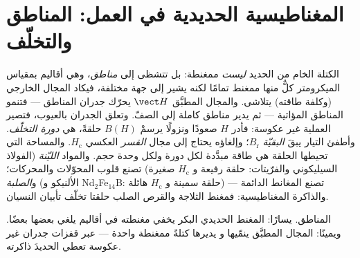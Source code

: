 \section{المغناطيسية الحديدية في العمل: المناطق والتخلّف}

\begin{definition}\label{def:b3:electromagnetism-in-matter:hysteresis}
الكتلة الخام من الحديد \emph{ليست} ممغنطة: بل تتشظى إلى
\emph{مناطق}، وهي أقاليم بمقياس الميكرومتر كلٌّ منها ممغنط تمامًا لكنه
يشير إلى جهة مختلفة، فيكاد المجال الخارجي (وكلفة طاقته)
يتلاشى. والمجال المطبَّق $\vect H$ يحرّك جدران المناطق ---
فتنمو المناطق المؤاتية --- ثم يدير مناطق كاملة إلى
الصفّ. وتعلق الجدران بالعيوب، فتصير العملية غير عكوسة: فأدر
$H$ صعودًا ونزولًا يرسمْ $B(H)$ حلقةً، هي \emph{دورة
التخلّف}. وأطفئ التيار يبقَ \emph{ البقيّة}
$B_{\text{r}}$؛ وإلغاؤه يحتاج إلى مجال \emph{القسر}
العكسي $H_{\text{c}}$. والمساحة التي تحيطها الحلقة هي
طاقة مبدَّدة لكل دورة ولكل وحدة حجم. والمواد \emph{الليّنة}
(الفولاذ السيليكوني والفرّيتات: حلقة رفيعة و
$H_{\text{c}}$ صغيرة) تصنع قلوب المحوّلات والمحركات؛ و\emph{الصلبة}
(الألنيكو و Nd$_2$Fe$_{14}$B: حلقة سمينة و $H_{\text{c}}$ هائلة) تصنع
المغانط الدائمة --- والذاكرة المغناطيسية: فمغنط الثلاجة
والقرص الصلب حلقتا تخلّف تأبيان النسيان.
\end{definition}

\begin{omfigure}

{\small المناطق. يسارًا: المغنط الحديدي البكر يخفي مغنطته
في أقاليم يلغي بعضها بعضًا. ويمينًا: المجال المطبَّق ينمّيها و
يديرها كتلةً ممغنطة واحدة --- عبر قفزات جدران غير عكوسة
تعطي الحديدَ ذاكرته.}
\end{omfigure}

